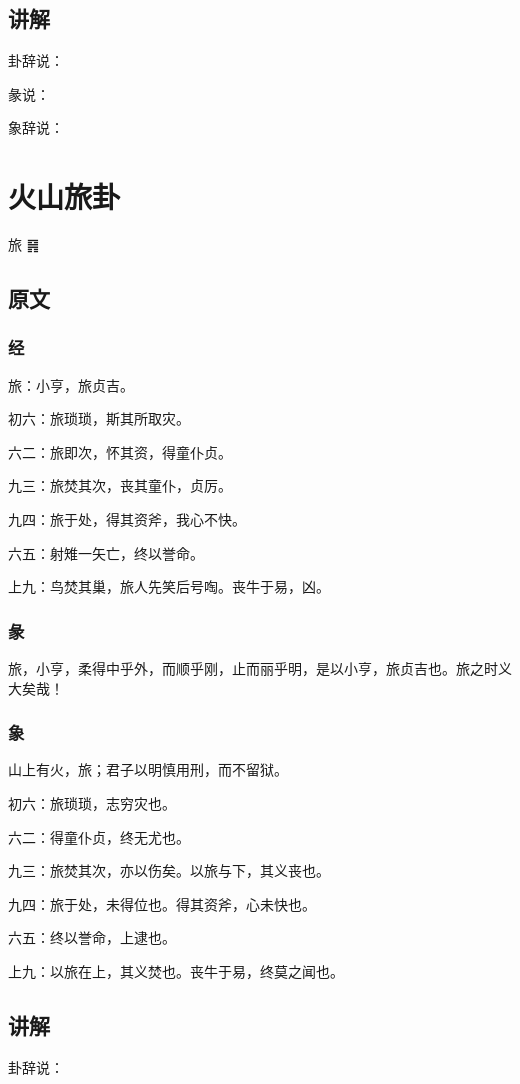 \documentclass[12pt,oneside]{book}
\begin{document}
\section{讲解}
卦辞说：

彖说：

象辞说：

\chapter{火山旅卦}
旅 {\Large ䷷}


\section{原文}

\subsection{经}
旅：小亨，旅贞吉。

初六：旅琐琐，斯其所取灾。

六二：旅即次，怀其资，得童仆贞。

九三：旅焚其次，丧其童仆，贞厉。

九四：旅于处，得其资斧，我心不快。

六五：射雉一矢亡，终以誉命。

上九：鸟焚其巢，旅人先笑后号啕。丧牛于易，凶。

\subsection{彖}
旅，小亨，柔得中乎外，而顺乎刚，止而丽乎明，是以小亨，旅贞吉也。旅之时义大矣哉！

\subsection{象}
山上有火，旅；君子以明慎用刑，而不留狱。

初六：旅琐琐，志穷灾也。

六二：得童仆贞，终无尤也。

九三：旅焚其次，亦以伤矣。以旅与下，其义丧也。

九四：旅于处，未得位也。得其资斧，心未快也。

六五：终以誉命，上逮也。

上九：以旅在上，其义焚也。丧牛于易，终莫之闻也。

\section{讲解}
卦辞说：
\end{document}

